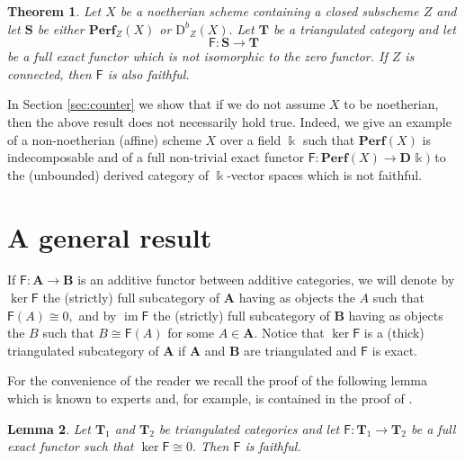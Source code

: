 \documentclass[a4paper,11pt,twoside]{amsart}
\newtheorem{thm}{Theorem}[section]
\newtheorem{lem}[thm]{Lemma}
\numberwithin{equation}{section}
\theoremstyle{definition}
\begin{document}
\begin{thm}\label{thm:main}
Let $X$ be a noetherian scheme containing a closed subscheme $Z$ and
let ${{\mathbf{{S}}}}$ be either ${{{\mathbf{{Perf}}}}}_Z(X)$ or ${\mathrm{D}^b}_Z(X).$ Let ${{\mathbf{{T}}}}$ be a
triangulated category and let
\[
{\mathsf{{F}}}\colon{{\mathbf{{S}}}}\longrightarrow{{\mathbf{{T}}}}
\]
be a full exact functor which is not isomorphic to the zero functor. If $Z$ is connected, then ${\mathsf{{F}}}$ is also faithful.	
\end{thm}

In Section \ref{sec:counter} we show that if we do not assume $X$ to
be noetherian, then the above result does not necessarily hold
true. Indeed, we give an example of a non-noetherian (affine) scheme
$X$ over a field ${\Bbbk}$ such that ${{{\mathbf{{Perf}}}}}(X)$ is indecomposable and of a
full non-trivial exact functor ${\mathsf{{F}}}\colon{{{\mathbf{{Perf}}}}}(X)\to{\mathbf{D}^{}}{\Bbbk})$ to the
(unbounded) derived category of ${\Bbbk}$-vector spaces which is not
faithful.

\section{A general result}\label{subsec:general}

If ${\mathsf{{F}}}\colon{{\mathbf{{A}}}}\to{{\mathbf{{B}}}}$ is an
additive functor between additive categories, we will denote by
$\ker{\mathsf{{F}}}$ the (strictly) full subcategory of ${{\mathbf{{A}}}}$ having as
objects the $A$ such that ${\mathsf{{F}}}(A){\cong}0,$ and by $\operatorname{im}{\mathsf{{F}}}$ the
(strictly) full subcategory of ${{\mathbf{{B}}}}$ having as objects the $B$
such that $B{\cong}{\mathsf{{F}}}(A)$ for some $A\in{{\mathbf{{A}}}}.$ Notice that
$\ker{\mathsf{{F}}}$ is a (thick) triangulated subcategory of ${{\mathbf{{A}}}}$ if
${{\mathbf{{A}}}}$ and ${{\mathbf{{B}}}}$ are triangulated and ${\mathsf{{F}}}$ is exact.

For the convenience of the reader we recall the proof of the following lemma which is known to experts and, for example, is contained
in the proof of \cite[Thm.\ 3.9]{Or}.

\begin{lem}\label{lem:faithful}
Let ${{\mathbf{{T}}}}_1$ and ${{\mathbf{{T}}}}_2$ be triangulated categories and let ${\mathsf{{F}}}:{{\mathbf{{T}}}}_1\to{{\mathbf{{T}}}}_2$ be a full exact functor such that $\ker{\mathsf{{F}}}{\cong} 0.$ Then ${\mathsf{{F}}}$ is faithful.
\end{lem}
\end{document}
